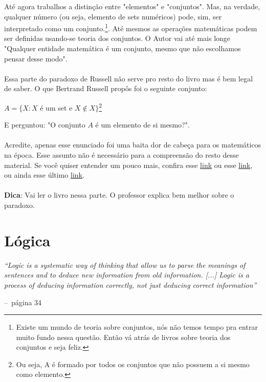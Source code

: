 \documentclass[a4paper,11pt]{book}
\makeatletter
\theoremstyle{definition}
\newenvironment{chapquote}[2][2em]
  {\setlength{\@tempdima}{#1}%
   \def\chapquote@author{#2}%
   \parshape 1 \@tempdima \dimexpr\textwidth-2\@tempdima\relax%
   \itshape}
  {\par\normalfont\hfill--\ \chapquote@author\hspace*{\@tempdima}\par\bigskip}
\makeatother
\begin{document}
Até agora trabalhos a distinção entre "elementos" e "conjuntos". Mas, na verdade, qualquer número (ou seja, elemento de sets numéricos) pode, sim, ser interpretado como um conjunto.\footnote{Existe um mundo de teoria sobre conjuntos, nós não temos tempo pra entrar muito fundo nessa questão. Então vá atrás de livros sobre teoria dos conjuntos e seja feliz.}. Até mesmos as operações matemáticas podem ser definidas usando-se teoria dos conjuntos. O Autor vai até mais longe "Qualquer entidade matemática é um conjunto, mesmo que não escolhamos pensar desse modo".
\\
\\
Essa parte do paradoxo de Russell não serve pro resto do livro mas é bem legal de saber. O que Bertrand Russell propôs foi o seguinte conjunto:
\begin{center}
	$ A = \{ X : X $ é um set e $X \notin X \}$\footnote{Ou seja, A é formado por todos os conjuntos que não possuem a si mesmo como elemento.}
\end{center}
E perguntou: "O conjunto $A$ é um elemento de si mesmo?".
\\
\\
Acredite, apenas esse enunciado foi uma baita dor de cabeça para os matemáticos na época. Esse assunto não é necessário para a compreensão do resto desse material. Se você quiser entender um pouco mais, confira esse \href{https://www.youtube.com/watch?v=AQTTYAM8BF0}{link} ou esse \href{https://www.youtube.com/watch?v=0Bs0lJRxOaI}{link}, ou ainda esse último \href{https://www.youtube.com/watch?v=HeQX2HjkcNo}{link}.
\\
\\
\textbf{Dica}: Vai ler o livro nessa parte. O professor explica bem melhor sobre o paradoxo.

\chapter{Lógica}

\begin{chapquote}{página 34}
	``Logic is a systematic way of thinking that allow us to parse the meanings of sentences and to deduce new information from old information. [...] Logic is  a process of deducing information correctly, not just deducing correct information''
\end{chapquote}
\end{document}
